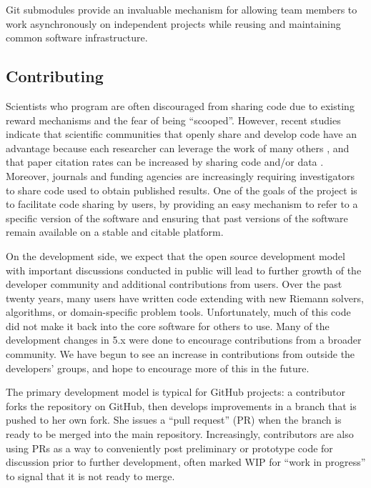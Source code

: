 Git submodules provide an invaluable
mechanism for allowing \clawpack team members to work asynchronously on
independent projects while reusing and maintaining common software
infrastructure.


\subsection{Contributing}

Scientists who program are often discouraged from sharing code
due to existing reward mechanisms and the fear of being ``scooped''.
However, recent studies indicate that
scientific communities that openly share and develop code
have an advantage because each researcher can leverage the work of
many others \cite{Turk:2013hd}, and that paper citation rates can be
increased by sharing code \cite{Vandewalle2012} and/or
data \cite{PiwowarDayEtAl2007}.
Moreover, journals and funding agencies are increasingly requiring
investigators to share code used to obtain published results.  One
of the goals of the \clawpack project is to facilitate code sharing
by users, by providing an easy mechanism to refer to a specific
version of the \clawpack software and ensuring that past versions
of the software remain available on a stable and citable platform.

On the development side, we expect that the open source development model
with important discussions conducted in public will lead to further growth of
the developer community and additional contributions from users.
Over the past twenty years, many users have written
code extending \clawpack with new Riemann solvers, algorithms, or
domain-specific problem tools.  Unfortunately, much of this code did not
make it back into the core software for others to use.
Many of the development changes in \clawpack 5.x were done
to encourage contributions from a broader community. We have begun to see an
increase in contributions from outside the developers' groups, and hope to
encourage more of this in the future.


The primary development model is typical for GitHub projects: a
contributor forks the repository on GitHub, then develops improvements
in a branch that is pushed to her own fork.  She issues a ``pull
request'' (PR) when the branch is ready to be merged into the main
repository.  Increasingly, contributors are also using PRs as a way to
conveniently post preliminary or prototype code for discussion prior
to further development, often marked WIP for ``work in progress'' to signal
that it is not ready to merge.

